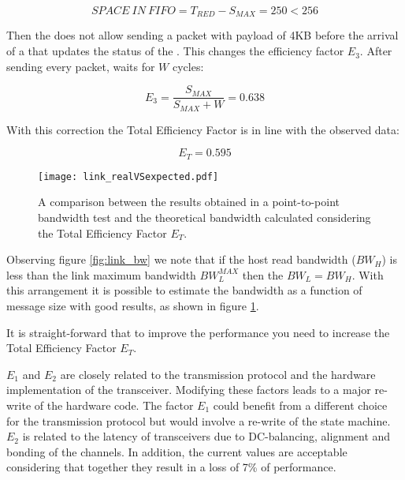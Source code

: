 $$SPACE\ IN\ FIFO=T_{RED}-S_{MAX}=250<256$$


Then the  does not allow sending a packet with payload of
4KB before the arrival of a \credit that updates the status of the
.
This changes the efficiency factor $E_{3}$. After sending every
packet,  waits for $W$ cycles:

$$E_{3}=\frac{S_{MAX}}{S_{MAX}+W}=0.638$$


With this correction the Total Efficiency Factor is in line with the
observed data:

$$E_{T} = 0.595$$


\begin{figure}[!hbt]
  \centering
  \texttt{[image: link\_realVSexpected.pdf]}
  \caption{A comparison between the results obtained in a
  point-to-point bandwidth test and the theoretical bandwidth
  calculated considering the Total Efficiency Factor $E_{T}$.}
  \label{fig:link_theory}
\end{figure}


Observing figure \ref{fig:link_bw} we note that if the host read
bandwidth ($BW_{H}$) is less than the link maximum bandwidth
$BW_{L}^{MAX}$ then the $BW_{L}=BW_{H}$.
With this arrangement it is possible to estimate the bandwidth as a
function of message size with good results, as shown in figure
\ref{fig:link_theory}.


It is straight-forward that to improve the  performance
you need to increase the Total Efficiency Factor $E_{T}$.

$E_{1}$ and $E_{2}$ are closely related to the transmission protocol
and the hardware implementation of the transceiver. Modifying these
factors leads to a major re-write of the hardware code. The factor
$E_{1}$ could benefit from a different choice for the transmission
protocol but would involve a re-write of the  state
machine. $E_{2}$ is related to the latency of transceivers due to
DC-balancing, alignment and bonding of the channels. In addition, the
current values are acceptable considering that together they result in
a loss of 7\% of performance.


